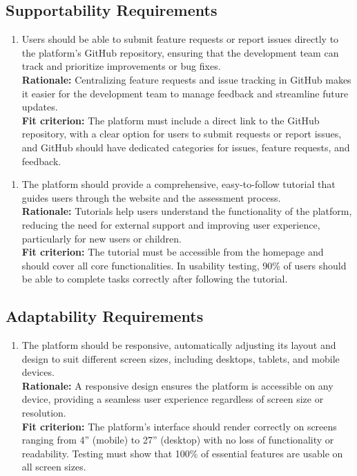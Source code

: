 \documentclass[12pt]{article}
\begin{document}
\subsection{Supportability Requirements}
\begin{enumerate}[{MS-SR}1. ]
  \item Users should be able to submit feature requests or report issues directly to the platform’s GitHub repository, ensuring that the development team can track and prioritize improvements or bug fixes.\\
  \textbf{Rationale: }Centralizing feature requests and issue tracking in GitHub makes it easier for the development team to manage feedback and streamline future updates.\\
  \textbf{Fit criterion: }The platform must include a direct link to the GitHub repository, with a clear option for users to submit requests or report issues, and GitHub should have dedicated categories for issues, 
  feature requests, and feedback.
\end{enumerate}
\begin{enumerate}[{MS-SR}2. ]
  \item The platform should provide a comprehensive, easy-to-follow tutorial that guides users through the website and the assessment process.\\
  \textbf{Rationale: }Tutorials help users understand the functionality of the platform, reducing the need for external support and improving user experience, particularly for new users or children.\\
  \textbf{Fit criterion: }The tutorial must be accessible from the homepage and should cover all core functionalities. In usability testing, 90\% of users should be able to complete tasks correctly after following the
   tutorial.
\end{enumerate}

\subsection{Adaptability Requirements}
\begin{enumerate}[{MS-AR}2. ]
  \item The platform should be responsive, automatically adjusting its layout and design to suit different screen sizes, including desktops, tablets, and mobile devices.\\
  \textbf{Rationale: }A responsive design ensures the platform is accessible on any device, providing a seamless user experience regardless of screen size or resolution.\\
  \textbf{Fit criterion: }The platform’s interface should render correctly on screens ranging from 4” (mobile) to 27” (desktop) with no loss of functionality or readability. Testing must show that 100\% of essential 
  features are usable on all screen sizes.
\end{enumerate}
\end{document}
